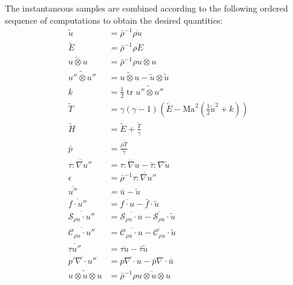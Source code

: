 \documentclass[letterpaper,11pt,nointlimits,reqno,draft]{amsbook}
\newcommand{\Mach}[1][]{\ensuremath{\mbox{Ma}_{#1}}}
\DeclareMathOperator{\trace}{tr}
\newcommand{\Ssd}{\ensuremath{\mathcal{S}}} %
\newcommand{\Cs}{\ensuremath{\mathcal{C}}}  %
\begin{document}
The instantaneous samples are combined according to the following ordered
sequence of computations to obtain the desired quantities:
{ \allowdisplaybreaks[1]
\begin{align}
  \tilde{u} &= \bar{\rho}^{-1} \overline{\rho{}u}
\\
  \tilde{E} &= \bar{\rho}^{-1} {\overline{\rho{}E}}
\\
  \widetilde{u\otimes{}u} &= \bar{\rho}^{-1} \overline{\rho{}u\otimes{}u}
\\
  \widetilde{u''\otimes{}u''} &=
  \widetilde{u\otimes{}u} - \tilde{u}\otimes\tilde{u}
\\
  k &= \frac{1}{2} \trace \widetilde{u''\otimes{}u''}
\\
  \tilde{T} &= \gamma\left(\gamma-1\right)\left(
      \tilde{E} - \Mach^2\left(\frac{1}{2}\tilde{u}^2 + k\right)
  \right)
\\
  \tilde{H} &= \tilde{E} + \frac{\tilde{T}}{\gamma}
\\
  \bar{p} &= \frac{\bar{\rho}\tilde{T}}{\gamma}
\\
  \overline{\tau:\nabla{}u''} &=
  \overline{\tau:\nabla{}u} - \bar{\tau}:\nabla\tilde{u}
\\
  \epsilon &= \bar{\rho}^{-1} \overline{\tau:\nabla{}u''}
\\
  \overline{u''} &= \bar{u} - \tilde{u}
\\
  \overline{f\cdot{}u''} &= \overline{f\cdot{}u} - \bar{f}\cdot{}\tilde{u}
\\
  \overline{\Ssd_{\rho{} u}\cdot{}u''}
  &= \overline{\Ssd_{\rho{} u}\cdot{}u}
   - \overline{\Ssd_{\rho{} u}}\cdot{}\tilde{u}
\\
  \overline{\Cs_{\rho{} u}\cdot{}u''}
  &= \overline{\Cs_{\rho{} u}\cdot{}u}
   - \overline{\Cs_{\rho{} u}}\cdot{}\tilde{u}
\\
  \overline{\tau{}u''} &= \overline{\tau{}u} - \bar{\tau}\tilde{u}
\\
  \overline{p'\nabla\cdot{}u''}
  &= \overline{p\nabla\cdot{}u}
   - \bar{p}\nabla\cdot\bar{u}
\\
  \widetilde{u\otimes{}u\otimes{}u}
  &= \bar{\rho}^{-1} \overline{\rho{}u\otimes{}u\otimes{}u}
\end{align}
}
\end{document}
